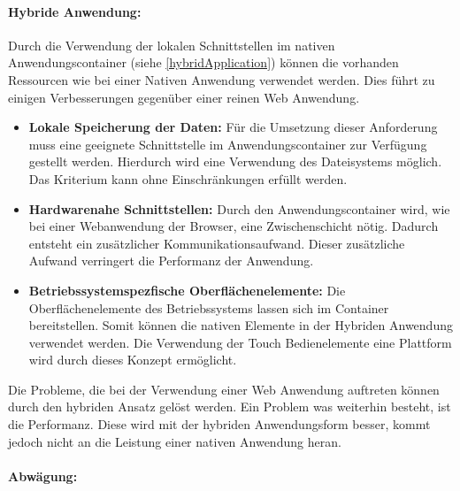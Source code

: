 \paragraph{Hybride Anwendung: }Durch die Verwendung der lokalen Schnittstellen im nativen Anwendungscontainer (siehe \ref{hybridApplication}) können die vorhanden Ressourcen wie bei einer Nativen Anwendung verwendet werden. Dies führt zu einigen Verbesserungen gegenüber einer reinen Web Anwendung.

\begin{itemize}
 \item \textbf{Lokale Speicherung der Daten:} Für die Umsetzung dieser Anforderung muss eine geeignete Schnittstelle im Anwendungscontainer zur Verfügung gestellt werden. Hierdurch wird eine Verwendung des Dateisystems möglich. Das Kriterium kann ohne Einschränkungen erfüllt werden. 
 
 \item \textbf{Hardwarenahe Schnittstellen:} Durch den Anwendungscontainer wird, wie bei einer Webanwendung der Browser, eine Zwischenschicht nötig. Dadurch entsteht ein zusätzlicher Kommunikationsaufwand. Dieser zusätzliche Aufwand verringert die Performanz der Anwendung.
 
 \item \textbf{Betriebssystemspezfische Oberflächenelemente:} Die Oberflächenelemente des Betriebssystems lassen sich im Container bereitstellen. Somit können die nativen Elemente in der Hybriden Anwendung verwendet werden. Die Verwendung der Touch Bedienelemente eine Plattform wird durch dieses Konzept ermöglicht.
 \end{itemize}
 Die Probleme, die bei der Verwendung einer Web Anwendung auftreten können durch den hybriden Ansatz gelöst werden. Ein Problem was weiterhin besteht, ist die Performanz. Diese wird mit der hybriden Anwendungsform besser, kommt jedoch nicht an die Leistung einer nativen Anwendung heran.

\paragraph{Abwägung: }

